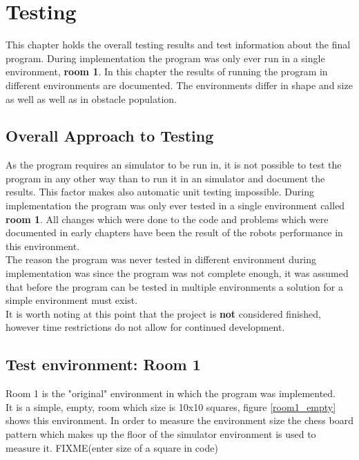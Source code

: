\chapter{Testing}
\label{Testing}
This chapter holds the overall testing results and test information about the final program. 
During implementation the program was only ever run in a single environment, \textbf{room 1}.
In this chapter the results of running the program in different environments are documented. The environments differ in shape and size as well as well as in obstacle population.

\section{Overall Approach to Testing}
As the program requires an simulator to be run in, it is not possible to test the program in any other way than to run it in an simulator and document the results. This factor makes also automatic unit testing impossible. During implementation the program was only ever tested in a single environment called \textbf{room 1}. All changes which were done to the code and problems which were documented in early chapters have been the result of the robots performance in this environment. \\[3ex]

The reason the program was never tested in different environment during implementation was since the program was not complete enough, it was assumed that before the program can be tested in multiple environments a solution for a simple environment must exist.\\
It is worth noting at this point that the project is \textbf{not} considered finished, however time restrictions do not allow for continued development.  

\section{Test environment: Room 1}

Room 1 is the "original" environment in which the program was implemented. \\
It is a simple, empty, room which size is 10x10 squares, figure \ref{room1_empty} shows this environment. In order to measure the environment size the chess board pattern which makes up the floor of the simulator environment is used to measure it. FIXME(enter size of a square in code)\\

